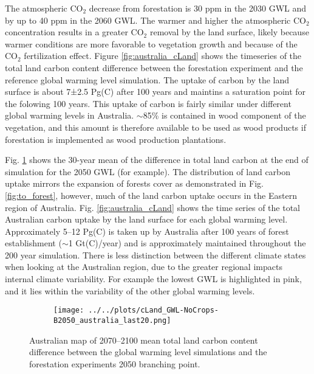 \documentclass[]{article}
\begin{document}
The atmospheric CO$_2$ decrease from forestation is 30 ppm in the 2030 GWL and by up to 40 ppm in the 2060 GWL.
The warmer and higher the atmospheric CO$_2$ concentration results in a greater CO$_2$ removal by the land surface, likely because warmer conditions are more favorable to vegetation growth and because of the CO$_2$ fertilization effect.
Figure \ref{fig:australia_cLand} shows the timeseries of the total land carbon content difference between the forestation experiment and the reference global warming level simulation.
The uptake of carbon by the land surface is about 7±2.5 Pg(C) after 100 years and maintins a saturation point for the folowing 100 years.
This uptake of carbon is fairly similar under different global warming levels in Australia.
$\sim$85\% is contained in wood component of the vegetation, and this amount is therefore available to be used as wood products if forestation is implemented as wood production plantations.

Fig. \ref{fig:aus_map_cLand} shows the 30-year mean of the difference in total land carbon at the end of simulation for the 2050 GWL (for example).
The distribution of land carbon uptake mirrors the expansion of forests cover as demonstrated in Fig. \ref{fig:to_forest}, however, much of the land carbon uptake occurs in the Eastern region of Australia.
Fig. \ref{fig:australia_cLand} shows the time series of the total Australian carbon uptake by the land surface for each global warming level.
Approximately 5–12 Pg(C) is taken up by Australia after 100 years of forest establishment ($\sim$1 Gt(C)/year) and is approximately maintained throughout the 200 year simulation.
There is less distinction between the different climate states when looking at the Australian region, due to the greater regional impacts internal climate variability.
For example the lowest GWL is highlighted in pink, and it lies within the variability of the other global warming levels.

\begin{figure}[H]
    \centering
    \begin{subfigure}[b]{\linewidth}
        \texttt{[image: ../../plots/cLand\_GWL-NoCrops-B2050\_australia\_last20.png]}
    \end{subfigure}
    \caption{Australian map of 2070--2100 mean total land carbon content difference between the global warming level simulations and the forestation experiments 2050 branching point.}
    \label{fig:aus_map_cLand}
\end{figure}
\end{document}
